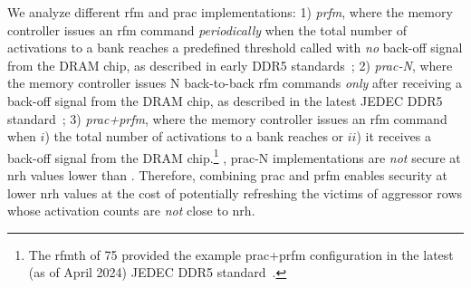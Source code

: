 We analyze  different \gls{rfm} and \gls{prac} implementations:
1) \emph{\gls{prfm}}, where the memory controller issues an \gls{rfm} command \emph{periodically} when the total number of activations to a bank reaches a predefined threshold called  with \emph{no} back-off signal from the DRAM chip, as described in early DDR5 standards~\cite{jedec2020jesd795};
2) \emph{\gls{prac}-N}, where the memory controller issues N back-to-back \gls{rfm} commands \emph{only} after receiving a back-off signal from the DRAM chip, as described in the latest JEDEC DDR5 standard~\cite{saroiu2024ddr5, jedec2024jesd795c};
3) \emph{\gls{prac}+\gls{prfm}}, where the memory controller issues an \gls{rfm} command when $i$) the total number of activations to a bank reaches  or $ii$) it receives a back-off signal from the DRAM chip.\footnote{The \gls{rfmth} of 75  provided  the example \gls{prac}+\gls{prfm} configuration in the latest (as of April 2024) JEDEC DDR5 standard~\cite{jedec2024jesd795c}.}
, \gls{prac}-N implementations are \emph{not} secure at \gls{nrh} values lower than .
Therefore, combining \gls{prac} and \gls{prfm} enables security at lower \gls{nrh} values at the cost of potentially refreshing the victims of aggressor rows whose activation counts are \emph{not} close to \gls{nrh}.